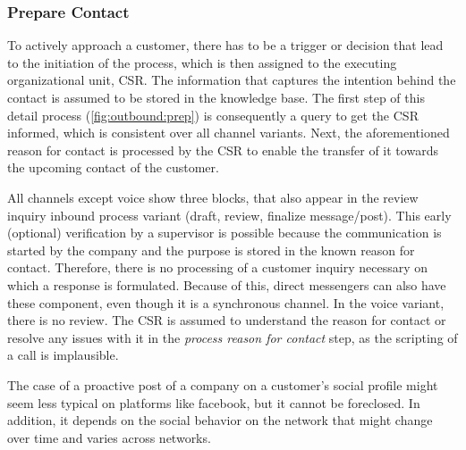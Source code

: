		\subsubsection{Prepare Contact}
		
		To actively approach a customer, there has to be a trigger or decision that lead to the initiation of the process, which is then assigned to the executing organizational unit, \ie \acrshort{CSR}. The information that captures the intention behind the contact is assumed to be stored in the knowledge base. The first step of this detail process (\Fig \ref{fig:outbound:prep}) is consequently a query to get the \acrshort{CSR} informed, which is consistent over all channel variants. Next, the aforementioned reason for contact is processed by the \acrshort{CSR} to enable the transfer of it towards the upcoming contact of the customer. 
		
		All channels except voice show three blocks, that also appear in the review inquiry inbound process variant (draft, review, finalize message/post). This early (optional) verification by a supervisor is possible because the communication is started by the company and the purpose is stored in the known reason for contact. Therefore, there is no processing of a customer inquiry necessary on which a response is formulated. Because of this, direct messengers can also have these component, even though it is a synchronous channel. In the voice variant, there is no review. The \acrshort{CSR} is assumed to understand the reason for contact or resolve any issues with it in the \textit{process reason for contact} step, as the scripting of a call is implausible. 
		
		The case of a proactive post of a company on a customer's social profile might seem less typical on platforms like facebook, but it cannot be foreclosed. In addition, it depends on the social behavior on the network that might change over time and varies across networks.  
		
